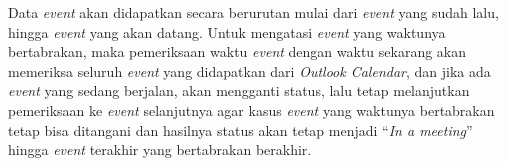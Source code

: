 Data \textit{event} akan didapatkan secara berurutan mulai dari \textit{event} yang sudah lalu, hingga \textit{event} yang akan datang. Untuk mengatasi \textit{event} yang waktunya bertabrakan, maka pemeriksaan waktu \textit{event} dengan waktu sekarang akan memeriksa seluruh \textit{event} yang didapatkan dari \textit{Outlook Calendar}, dan jika ada \textit{event} yang sedang berjalan, akan mengganti status, lalu tetap melanjutkan pemeriksaan ke \textit{event} selanjutnya agar kasus \textit{event} yang waktunya bertabrakan tetap bisa ditangani dan hasilnya status akan tetap menjadi ``\textit{In a meeting}'' hingga \textit{event} terakhir yang bertabrakan berakhir. 
